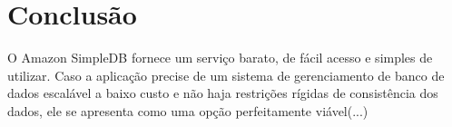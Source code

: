 \chapter{Conclusão}
O Amazon SimpleDB fornece um serviço barato, de fácil acesso e simples de utilizar. Caso a aplicação precise de um sistema de gerenciamento de banco de dados escalável a baixo custo e não haja restrições rígidas de consistência dos dados, ele se apresenta como uma opção perfeitamente viável(...)